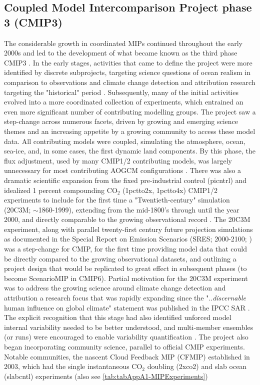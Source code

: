 \documentclass[gmd, preprint]{copernicus}
\begin{document}
\subsection{Coupled Model Intercomparison Project phase 3 (CMIP3)}
\label{sec:cmip3}
The considerable growth in coordinated MIPs continued throughout the early 2000s and led to the development of what became known as the third phase CMIP3 \citep{meehl_wcrp_2007}. In the early stages, activities that came to define the project were more identified by discrete subprojects, targeting science questions of ocean realism in comparison to observations \citep{orr_ocean_1999, dutay_evaluation_2002, dutay_evaluation_2004} and climate change detection and attribution research targeting the "historical" period \citep{hegerl_20c3m_2003}. Subsequently, many of the initial activities evolved into a more coordinated collection of experiments, which entrained an even more significant number of contributing modelling groups. The project saw a step-change across numerous facets, driven by growing and emerging science themes and an increasing appetite by a growing community to access these model data. All contributing models were coupled, simulating the atmosphere, ocean, sea-ice, and, in some cases, the first dynamic land components. By this phase, the flux adjustment, used by many CMIP1/2 contributing models, was largely unnecessary for most contributing AOGCM configurations \citep{durack_ocean_2012}. There was also a dramatic scientific expansion from the fixed pre-industrial control (picntrl) and idealized 1 percent compounding CO$_{2}$ (1pctto2x, 1pctto4x) CMIP1/2 experiments to include for the first time a "Twentieth-century" simulation (20C3M; $\sim$1860-1999), extending from the mid-1800's through until the year 2000, and directly comparable to the growing observational record \citep{meehl_wcrp_2007}. The 20C3M experiment, along with parallel twenty-first century future projection simulations as documented in the Special Report on Emission Scenarios (SRES; 2000-2100; \citet{nakicenovic_summary_2000}) was a step-change for CMIP, for the first time providing model data that could be directly compared to the growing observational datasets, and outlining a project design that would be replicated to great effect in subsequent phases (to become ScenarioMIP in CMIP6). Partial motivation for the 20C3M experiment was to address the growing science around climate change detection and attribution \citep{santer_detection_1996-1, hegerl_20c3m_2003} a research focus that was rapidly expanding since the "..\emph{discernable} human influence on global climate" statement was published in the IPCC SAR \citep{santer_detection_1996}. The explicit recognition that this stage had also identified unforced model internal variability needed to be better understood, and multi-member ensembles (or runs) were encouraged to enable variability quantification \citep{meehl_wcrp_2007}. The project also began incorporating community science, parallel to official CMIP experiments. Notable communities, the nascent Cloud Feedback MIP (CFMIP) established in 2003, which had the single instantaneous CO$_{2}$ doubling (2xco2) and slab ocean (slabcntl) experiments (also see \autoref{tab:tabAppA1-MIPExperiments}) 
\end{document}
